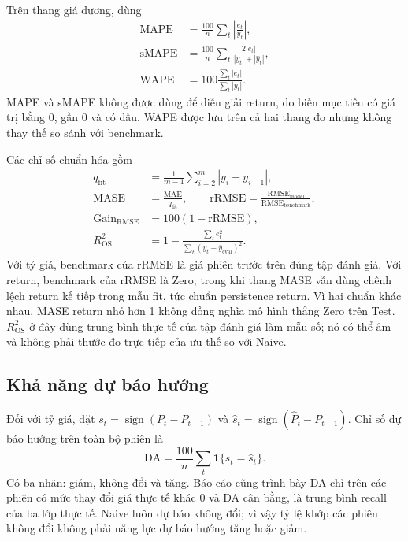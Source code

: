 \documentclass[a4paper,reqno,oneside]{book}
\numberwithin{equation}{chapter}
\begin{document}
Trên thang giá dương, dùng
\begin{align}
 \mathrm{MAPE}&=\frac{100}{n}\sum_t\left|\frac{e_t}{y_t}\right|,\\
 \mathrm{sMAPE}&=\frac{100}{n}\sum_t\frac{2|e_t|}{|y_t|+|\widehat y_t|},\\
 \mathrm{WAPE}&=100\frac{\sum_t|e_t|}{\sum_t|y_t|}.
\end{align}
MAPE và sMAPE không được dùng để diễn giải return, do biến mục tiêu có giá trị bằng 0, gần 0 và có dấu. WAPE được lưu trên cả hai thang đo nhưng không thay thế so sánh với benchmark.

Các chỉ số chuẩn hóa gồm
\begin{align}
 q_{\mathrm{fit}}&=\frac{1}{m-1}\sum_{i=2}^{m}|y_i-y_{i-1}|,\\
 \mathrm{MASE}&=\frac{\mathrm{MAE}}{q_{\mathrm{fit}}},\qquad
 \mathrm{rRMSE}=\frac{\mathrm{RMSE}_{\mathrm{model}}}
                        {\mathrm{RMSE}_{\mathrm{benchmark}}},\\
 \mathrm{Gain}_{\mathrm{RMSE}}&=100(1-\mathrm{rRMSE}),\\
 R^2_{\mathrm{OS}}&=1-\frac{\sum_t e_t^2}{\sum_t(y_t-\bar y_{\mathrm{eval}})^2}.
\end{align}
Với tỷ giá, benchmark của rRMSE là giá phiên trước trên đúng tập đánh giá. Với return, benchmark của rRMSE là Zero; trong khi thang MASE vẫn dùng chênh lệch return kế tiếp trong mẫu fit, tức chuẩn persistence return. Vì hai chuẩn khác nhau, MASE return nhỏ hơn 1 không đồng nghĩa mô hình thắng Zero trên Test. $R^2_{\mathrm{OS}}$ ở đây dùng trung bình thực tế của tập đánh giá làm mẫu số; nó có thể âm và không phải thước đo trực tiếp của ưu thế so với Naive.

\subsection{Khả năng dự báo hướng}

Đối với tỷ giá, đặt $s_t=\operatorname{sign}(P_t-P_{t-1})$ và $\widehat s_t=\operatorname{sign}(\widehat P_t-P_{t-1})$. Chỉ số dự báo hướng trên toàn bộ phiên là
\begin{equation}
 \mathrm{DA}=\frac{100}{n}\sum_t\mathbf1\{s_t=\widehat s_t\}.
\end{equation}
Có ba nhãn: giảm, không đổi và tăng. Báo cáo cũng trình bày DA chỉ trên các phiên có mức thay đổi giá thực tế khác 0 và DA cân bằng, là trung bình recall của ba lớp thực tế. Naive luôn dự báo không đổi; vì vậy tỷ lệ khớp các phiên không đổi không phải năng lực dự báo hướng tăng hoặc giảm.
\end{document}
